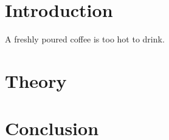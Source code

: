 \documentclass[a4paper,11pt]{article}
\begin{document}
\section{Introduction}
A freshly poured coffee is too hot to drink.

\section{Theory}

\section{Conclusion}
\end{document}
